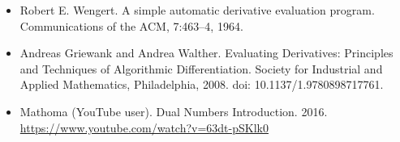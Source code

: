 \documentclass[11pt]{article}
\theoremstyle{definition}
\theoremstyle{plain}
\begin{document}
\begin{itemize}
    \item Robert E. Wengert. A simple automatic derivative evaluation program. 
    Communications of the ACM, 7:463–4, 1964.

    \item Andreas Griewank and Andrea Walther. Evaluating Derivatives: 
    Principles and Techniques of Algorithmic Differentiation. Society for 
    Industrial and Applied Mathematics, Philadelphia, 2008. doi: 10.1137/1.9780898717761.

    \item Mathoma (YouTube user). Dual Numbers Introduction. 2016.
    \url{https://www.youtube.com/watch?v=63dt-pSKlk0}

\end{itemize}
\end{document}
